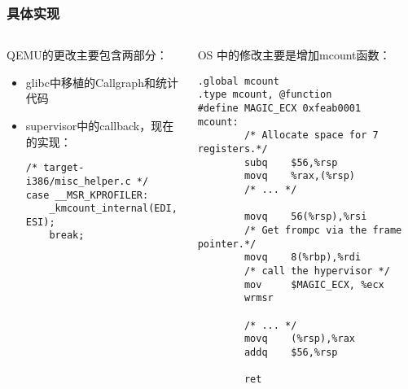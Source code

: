 \documentclass{beamer}
\begin{document}
\begin{frame}[fragile]
	\frametitle{具体实现}
	\begin{columns}[T]
	\begin{column}{0.5\textwidth}
	QEMU的更改主要包含两部分：
	\begin{itemize}
		\item glibc中移植的Callgraph和统计代码
		\item supervisor中的callback，现在的实现：
	\tiny{
		\begin{verbatim}
/* target-i386/misc_helper.c */
case __MSR_KPROFILER:
    _kmcount_internal(EDI, ESI);
    break;		
	\end{verbatim}
	}
	\end{itemize}
	\end{column}
	\begin{column}{0.5\textwidth}
OS 中的修改主要是增加mcount函数：
\tiny{
	\begin{Verbatim}[frame=single]
.global mcount
.type mcount, @function
#define MAGIC_ECX 0xfeab0001
mcount:
        /* Allocate space for 7 registers.*/
        subq    $56,%rsp
        movq    %rax,(%rsp)
        /* ... */

        movq    56(%rsp),%rsi
        /* Get frompc via the frame pointer.*/
        movq    8(%rbp),%rdi
        /* call the hypervisor */
        mov     $MAGIC_ECX, %ecx
        wrmsr

        /* ... */
        movq    (%rsp),%rax
        addq    $56,%rsp

        ret
	\end{Verbatim}
}
	
	\end{column}
	\end{columns}

\end{frame}
\end{document}
